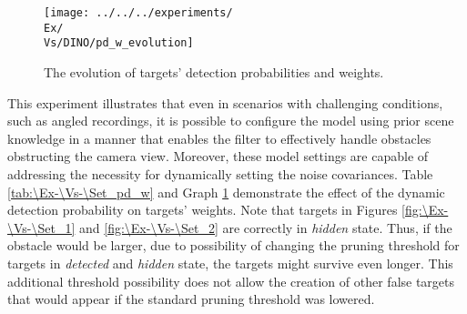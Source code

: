 \begin{figure}[H]
    \centering
    \texttt{[image: ../../../experiments/\\Ex/\\Vs/DINO/pd\_w\_evolution]}
    \caption{The evolution of targets' detection probabilities and weights.}
    \label{gr:\Ex-\Vs-\Set}
\end{figure}

This experiment illustrates that even in scenarios with challenging conditions, such as angled recordings, it is
possible to configure the model using prior scene knowledge in \linebreak a manner that enables the filter to effectively handle
obstacles obstructing the camera view.
Moreover, these model settings are capable of addressing the necessity for dynamically setting the noise covariances.
Table \ref{tab:\Ex-\Vs-\Set_pd_w} and Graph \ref{gr:\Ex-\Vs-\Set} demonstrate the effect of the dynamic detection probability
on targets' weights.
Note that targets
in Figures \ref{fig:\Ex-\Vs-\Set_1} and \ref{fig:\Ex-\Vs-\Set_2} are correctly in \textit{hidden} state. Thus, if the
obstacle would be larger, due to possibility of changing the pruning threshold for targets in \textit{detected} and \textit{hidden} state, the targets might survive even longer. This additional threshold possibility does not allow the creation of other false targets that would appear if the standard pruning threshold was lowered.